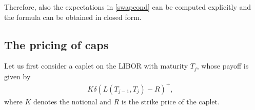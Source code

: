 \documentclass[12pt,a4paper]{article}
\theoremstyle{plain}
\numberwithin{equation}{section}
\begin{document}

Therefore, also the expectations in \eqref{swapcond} can be computed explicitly and the formula can be obtained in closed form.

\subsection{The pricing of caps}

Let us first consider a caplet on the LIBOR with maturity $T_{j}$, whose payoff is given by
\begin{align*}
K\delta\left( L(T_{j-1}, T_j)-R\right)^+,&
\end{align*}
where $K$ denotes the notional and $R$ is the strike price of the caplet.
\end{document}
